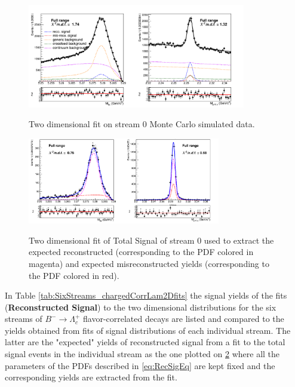 \begin{figure}[h!]
{\includegraphics[width=0.85\textwidth]{04-chargedCorrBtoLambda/figs/Total_2DFit_stream0_w_crossfeed_ratio_param.png}}
\caption{Two dimensional fit on stream 0 Monte Carlo simulated data.}
\label{fig:stream0_Total2Dfit_charged_corrLambdaC}
\end{figure}

\begin{figure}[h!]
{\includegraphics[width=0.75\textwidth]{04-chargedCorrBtoLambda/figs/stream0_TotalSignal_charged_corrLambdaC_2Dfit.png}}
\caption{Two dimensional fit of Total Signal of stream 0 used to extract the expected reconstructed (corresponding to the PDF colored in magenta) and expected misreconstructed yields (corresponding to the PDF colored in red).}
\label{fig:stream0_TotalSignal_charged_corrLambdaC_2Dfit}
\end{figure}


In Table \ref{tab:SixStreams_chargedCorrLam2Dfits} the signal yields of the fits (\textbf{Reconstructed Signal}) to the two dimensional distributions for the six streams of $B^- \rightarrow \Lambda_c^+$ flavor-correlated decays are listed and compared to the yields obtained from fits of signal distributions of each individual stream. The latter are the "expected" yields of reconstructed signal from a fit to the total signal events in the individual stream as the one plotted on \cref{fig:stream0_TotalSignal_charged_corrLambdaC_2Dfit} where all the parameters of the PDFs described in \cref{eq:RecSigEq} are kept fixed and the corresponding yields are extracted from the fit. 

